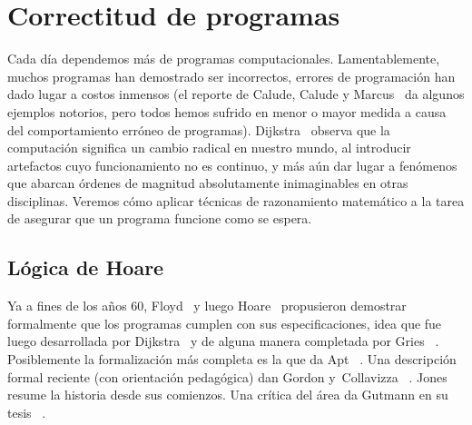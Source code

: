 %

\chapter{Correctitud de programas}
\label{cha:programas}

  Cada día dependemos más de programas computacionales.
  Lamentablemente,
  muchos programas han demostrado ser incorrectos,
  errores de programación han dado lugar a costos inmensos
  (el reporte de Calude, Calude y Marcus~%
     \cite{calude07:_provin_progr}
   da algunos ejemplos notorios,
   pero todos hemos sufrido en menor o mayor medida
   a causa del comportamiento erróneo de programas).
  Dijkstra~\cite{dijkstra89:_cruelty_teach_comput_scien}%
  observa que la computación
  significa un cambio radical en nuestro mundo,
  al introducir artefactos cuyo funcionamiento no es continuo,
  y más aún dar lugar a fenómenos que abarcan órdenes de magnitud
  absolutamente inimaginables en otras disciplinas.
  Veremos cómo aplicar técnicas de razonamiento matemático
  a la tarea de asegurar que un programa funcione como se espera.

\section{Lógica de Hoare}
\label{sec:logica-de-hoare}

%

  Ya a fines de los años 60,
  Floyd~\cite{floyd67:_assig_meanin_progr}%
  y luego Hoare~\cite{hoare69:_axiom_basis_comput_progr}%
  propusieron demostrar formalmente
  que los programas cumplen con sus especificaciones,
  idea que fue luego desarrollada por Dijkstra~%
    \cite{dijkstra76:_discip_progr}
  y de alguna manera completada por Gries~%
    \cite{gries87:_scien_progr}.%
  Posiblemente la formalización más completa es la que da Apt~%
    \cite{apt81:_ten_years_hoare_logic,
	  apt84:_ten_years_hoare_logic}.
  Una descripción formal reciente
  (con orientación pedagógica)
  dan Gordon y~Collavizza~%
    \cite{gordon10:_forwar_hoare}.
  Jones~%
    \cite{jones03:_early_searc_tract_ways_reason_about_progr}
  resume la historia desde sus comienzos.
  Una crítica del área da Gutmann en su tesis~%
    \cite[capítulos~4 y~5]{gutmann04:_crypt_sec_arch}.

